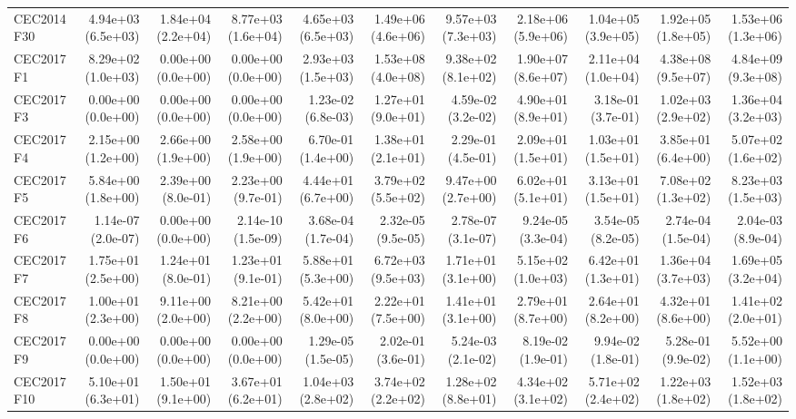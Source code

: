 \begin{longtable}{lrrrrrrrrrr}
CEC2014 F30 & 4.94e+03 (6.5e+03) & 1.84e+04 (2.2e+04) & 8.77e+03 (1.6e+04) & 4.65e+03 (6.5e+03) & 1.49e+06 (4.6e+06) & 9.57e+03 (7.3e+03) & 2.18e+06 (5.9e+06) & 1.04e+05 (3.9e+05) & 1.92e+05 (1.8e+05) & 1.53e+06 (1.3e+06) \\
CEC2017 F1 & 8.29e+02 (1.0e+03) & 0.00e+00 (0.0e+00) & 0.00e+00 (0.0e+00) & 2.93e+03 (1.5e+03) & 1.53e+08 (4.0e+08) & 9.38e+02 (8.1e+02) & 1.90e+07 (8.6e+07) & 2.11e+04 (1.0e+04) & 4.38e+08 (9.5e+07) & 4.84e+09 (9.3e+08) \\
CEC2017 F3 & 0.00e+00 (0.0e+00) & 0.00e+00 (0.0e+00) & 0.00e+00 (0.0e+00) & 1.23e-02 (6.8e-03) & 1.27e+01 (9.0e+01) & 4.59e-02 (3.2e-02) & 4.90e+01 (8.9e+01) & 3.18e-01 (3.7e-01) & 1.02e+03 (2.9e+02) & 1.36e+04 (3.2e+03) \\
CEC2017 F4 & 2.15e+00 (1.2e+00) & 2.66e+00 (1.9e+00) & 2.58e+00 (1.9e+00) & 6.70e-01 (1.4e+00) & 1.38e+01 (2.1e+01) & 2.29e-01 (4.5e-01) & 2.09e+01 (1.5e+01) & 1.03e+01 (1.5e+01) & 3.85e+01 (6.4e+00) & 5.07e+02 (1.6e+02) \\
CEC2017 F5 & 5.84e+00 (1.8e+00) & 2.39e+00 (8.0e-01) & 2.23e+00 (9.7e-01) & 4.44e+01 (6.7e+00) & 3.79e+02 (5.5e+02) & 9.47e+00 (2.7e+00) & 6.02e+01 (5.1e+01) & 3.13e+01 (1.5e+01) & 7.08e+02 (1.3e+02) & 8.23e+03 (1.5e+03) \\
CEC2017 F6 & 1.14e-07 (2.0e-07) & 0.00e+00 (0.0e+00) & 2.14e-10 (1.5e-09) & 3.68e-04 (1.7e-04) & 2.32e-05 (9.5e-05) & 2.78e-07 (3.1e-07) & 9.24e-05 (3.3e-04) & 3.54e-05 (8.2e-05) & 2.74e-04 (1.5e-04) & 2.04e-03 (8.9e-04) \\
CEC2017 F7 & 1.75e+01 (2.5e+00) & 1.24e+01 (8.0e-01) & 1.23e+01 (9.1e-01) & 5.88e+01 (5.3e+00) & 6.72e+03 (9.5e+03) & 1.71e+01 (3.1e+00) & 5.15e+02 (1.0e+03) & 6.42e+01 (1.3e+01) & 1.36e+04 (3.7e+03) & 1.69e+05 (3.2e+04) \\
CEC2017 F8 & 1.00e+01 (2.3e+00) & 9.11e+00 (2.0e+00) & 8.21e+00 (2.2e+00) & 5.42e+01 (8.0e+00) & 2.22e+01 (7.5e+00) & 1.41e+01 (3.1e+00) & 2.79e+01 (8.7e+00) & 2.64e+01 (8.2e+00) & 4.32e+01 (8.6e+00) & 1.41e+02 (2.0e+01) \\
CEC2017 F9 & 0.00e+00 (0.0e+00) & 0.00e+00 (0.0e+00) & 0.00e+00 (0.0e+00) & 1.29e-05 (1.5e-05) & 2.02e-01 (3.6e-01) & 5.24e-03 (2.1e-02) & 8.19e-02 (1.9e-01) & 9.94e-02 (1.8e-01) & 5.28e-01 (9.9e-02) & 5.52e+00 (1.1e+00) \\
CEC2017 F10 & 5.10e+01 (6.3e+01) & 1.50e+01 (9.1e+00) & 3.67e+01 (6.2e+01) & 1.04e+03 (2.8e+02) & 3.74e+02 (2.2e+02) & 1.28e+02 (8.8e+01) & 4.34e+02 (3.1e+02) & 5.71e+02 (2.4e+02) & 1.22e+03 (1.8e+02) & 1.52e+03 (1.8e+02) \\

\end{longtable}
